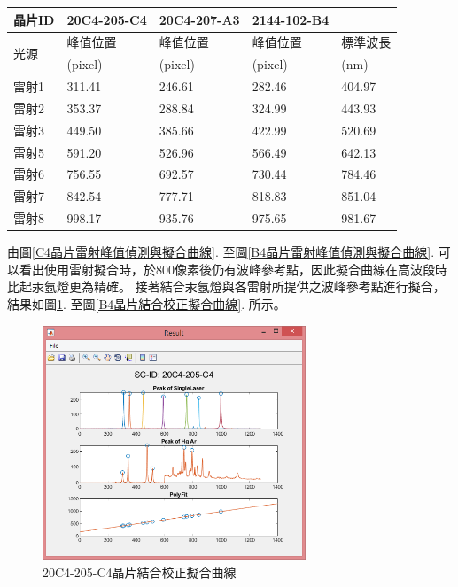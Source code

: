\begin{center}
	\vspace{0.8cm}
	\label{不同晶片雷射校正波峰參數表}
\begin{tabularx}{\textwidth}{m{}<{\centering}m{}<{\centering}m{}<{\centering}m{}<{\centering}m{}<{\centering}}
	\hline\hline
	晶片ID&20C4-205-C4&20C4-207-A3&2144-102-B4&\\
	\hline
	\multirow{2}{*}{光源}
	&峰值位置&峰值位置&峰值位置&標準波長\\
	&(pixel)&(pixel)&(pixel)&(nm)\\
	\hline
	雷射1&311.41&246.61&282.46&404.97\\
	雷射2&353.37&288.84&324.99&443.93\\
	雷射3&449.50&385.66&422.99&520.69\\
	雷射5&591.20&526.96&566.49&642.13\\
	雷射6&756.55&692.57&730.44&784.46\\
	雷射7&842.54&777.71&818.83&851.04\\
	雷射8&998.17&935.76&975.65&981.67\\
	\hline\hline
\end{tabularx}
\vspace{10pt}
\end{center}
\newpage
由圖\ref{C4晶片雷射峰值偵測與擬合曲線}. 至圖\ref{B4晶片雷射峰值偵測與擬合曲線}. 可以看出使用雷射擬合時，於800像素後仍有波峰參考點，因此擬合曲線在高波段時比起汞氬燈更為精確。
接著結合汞氬燈與各雷射所提供之波峰參考點進行擬合，結果如圖\ref{C4晶片結合校正擬合曲線}. 至圖\ref{B4晶片結合校正擬合曲線}. 所示。
\begin{figure}[H] %
	\centering %
	\vspace{0.8cm}
	\includegraphics[width=0.7\textwidth]{figures/Result/比較/C4-COM.jpg} %
	\caption{20C4-205-C4晶片結合校正擬合曲線} %
	\label{C4晶片結合校正擬合曲線} %
\end{figure}
